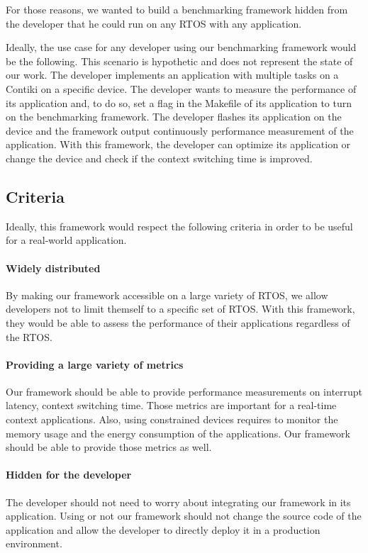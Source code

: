 For those reasons, we wanted to build a benchmarking framework hidden from the developer that he could run on any RTOS with any application.

Ideally, the use case for any developer using our benchmarking framework would be the following.
This scenario is hypothetic and does not represent the state of our work.
The developer implements an application with multiple tasks on a Contiki on a specific device.
The developer wants to measure the performance of its application and, to do so, set a flag in the Makefile of its application to turn on the benchmarking framework.
The developer flashes its application on the device and the framework output continuously performance measurement of the application.
With this framework, the developer can optimize its application or change the device and check if the context switching time is improved.

\subsection{Criteria}

Ideally, this framework would respect the following criteria in order to be useful for a real-world application.

\paragraph{Widely distributed}
By making our framework accessible on a large variety of RTOS, we allow developers not to limit themself to a specific set of RTOS.
With this framework, they would be able to assess the performance of their applications regardless of the RTOS.

\paragraph{Providing a large variety of metrics}
Our framework should be able to provide performance measurements on interrupt latency, context switching time.
Those metrics are important for a real-time context applications.
Also, using constrained devices requires to monitor the memory usage and the energy consumption of the applications.
Our framework should be able to provide those metrics as well.

\paragraph{Hidden for the developer}
The developer should not need to worry about integrating our framework in its application.
Using or not our framework should not change the source code of the application and allow the developer to directly deploy it in a production environment.

